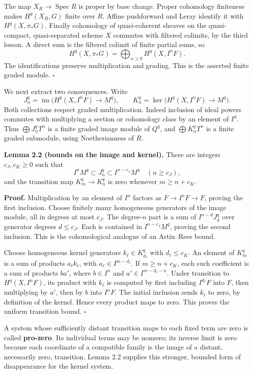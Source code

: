 \documentclass[11pt]{article}
\begin{document}
The map \(X_R\to\operatorname{Spec}R\) is proper by base change. Proper
cohomology finiteness makes \(H^q(X_R,G)\) finite over \(R\). Affine
pushforward and Leray identify it with \(H^q(X,\pi_*G)\). Finally
cohomology of quasi-coherent sheaves on the quasi-compact,
quasi-separated scheme \(X\) commutes with filtered colimits, by the
third lesson. A direct sum is the filtered colimit of finite partial
sums, so \[
H^q(X,\pi_*G)=\bigoplus_{n\geq0}H^q(X,I^nF).
\] The identifications preserve multiplication and grading. This is the
asserted finite graded module. \(\square\)

We next extract two consequences. Write \[
J_n^q=\operatorname{im}\bigl(H^q(X,I^nF)\to M^q\bigr),
\qquad K_n^q=\ker\bigl(H^q(X,I^nF)\to M^q\bigr).
\] Both collections respect graded multiplication. Indeed inclusion of
ideal powers commutes with multiplying a section or cohomology class by
an element of \(I^d\). Thus \(\bigoplus J_n^qT^n\) is a finite graded
image module of \(Q^q\), and \(\bigoplus K_n^qT^n\) is a finite graded
submodule, using Noetherianness of \(R\).

\textbf{Lemma 2.2 (bounds on the image and kernel).} There are integers
\(c_J,c_K\geq0\) such that \[
I^nM^q\subset J_n^q\subset I^{n-c_J}M^q\quad(n\geq c_J),
\] and the transition map \(K_m^q\to K_n^q\) is zero whenever
\(m\geq n+c_K\).

\textbf{Proof.} Multiplication by an element of \(I^n\) factors as
\(F\to I^nF\to F\), proving the first inclusion. Choose finitely many
homogeneous generators of the image module, all in degrees at most
\(c_J\). The degree-\(n\) part is a sum of \(I^{n-d}J_d^q\) over
generator degrees \(d\leq c_J\). Each is contained in \(I^{n-c_J}M^q\),
proving the second inclusion. This is the cohomological analogue of an
Artin--Rees bound.

Choose homogeneous kernel generators \(k_\ell\in K_{d_\ell}^q\) with
\(d_\ell\leq c_K\). An element of \(K_m^q\) is a sum of products
\(a_\ell k_\ell\), with \(a_\ell\in I^{m-d_\ell}\). If \(m\geq n+c_K\),
each such coefficient is a sum of products \(ba'\), where \(b\in I^n\)
and \(a'\in I^{m-d_\ell-n}\). Under transition to \(H^q(X,I^nF)\), its
product with \(k_\ell\) is computed by first including \(I^{d_\ell}F\)
into \(F\), then multiplying by \(a'\), then by \(b\) into \(I^nF\). The
initial inclusion sends \(k_\ell\) to zero, by definition of the kernel.
Hence every product maps to zero. This proves the uniform transition
bound. \(\square\)

A system whose sufficiently distant transition maps to each fixed term
are zero is called \textbf{pro-zero}. Its individual terms may be
nonzero; its inverse limit is zero because each coordinate of a
compatible family is the image of a distant, necessarily zero,
transition. Lemma 2.2 supplies this stronger, bounded form of
disappearance for the kernel system.
\end{document}
